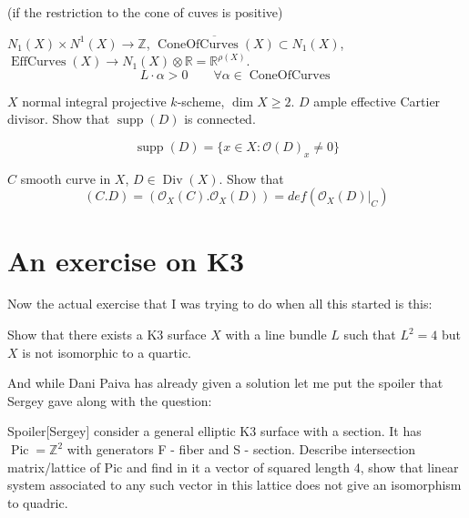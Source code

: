 \begin{thm}\leavevmode
	(if the restriction to the cone of cuves is positive)

	$N_1(X)\times N^1(X)\longrightarrow\mathbb{Z}$, $\overline{\operatorname{ConeOfCurves}(X)}\subset N_1(X)$, $\operatorname{EffCurves}(X)\to N_1(X)\otimes \mathbb{R}=\mathbb{R}^{\rho(X)}$.
	\[L\cdot\alpha>0\qquad \forall \alpha\in\operatorname{ConeOfCurves}\]
\end{thm}

\begin{exercise}[Lucas]\leavevmode
	$X$ normal integral projective $k$-scheme, $\dim X\geq 2$. $D$ ample effective Cartier divisor. Show that $\operatorname{supp}(D)$ is connected.
\end{exercise}

\begin{defn}[Victor]\leavevmode
	\[ \operatorname{supp}(D)=\{x \in X: \mathcal{O}(D)_x\neq 0\}\]
	
\end{defn}


\begin{exercise}[Lucas]\leavevmode
	$C$ smooth curve in $X$, $D\in \operatorname{Div}(X)$. Show that
	\[(C.D)=(\mathcal{O}_X(C).\mathcal{O}_X(D))=def(\mathcal{O}_X(D)|_{C})\]
\end{exercise}



\section{An exercise on K3}

Now the actual exercise that I was trying to do when all this started is this:

\begin{exercise}\leavevmode
	Show that there exists a K3 surface $X$ with a line bundle  $L$ such that  $L^2=4$ but $X$ is not isomorphic to a quartic.
\end{exercise}

And while Dani Paiva has already given a solution let me put the spoiler that Sergey gave along with the question: 

\begin{thing4}{Spoiler}[Sergey]\leavevmode
consider a general elliptic K3 surface with a section. It has $\operatorname{Pic} = \mathbb{Z}^2$ with generators F - fiber and S - section. Describe intersection matrix/lattice of Pic and find in it a vector of squared length 4, show that linear system associated to any such vector in this lattice does not give an isomorphism to quadric.
\end{thing4}




